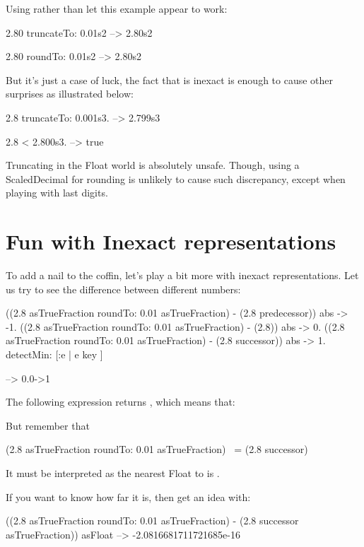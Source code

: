\documentclass[a4paper,10pt,twoside]{book}
\begin{document}
Using  rather than   let this example appear to work:
\begin{code}{}
2.80 truncateTo: 0.01s2
	-->  2.80s2
	
2.80 roundTo: 0.01s2
	-->  2.80s2
\end{code}

But it's just a case of luck, the fact that  is inexact is enough to cause other surprises as illustrated below:
\begin{code}{}
2.8 truncateTo: 0.001s3.
	--> 2.799s3
	
2.8 < 2.800s3.
	--> true
\end{code}

Truncating in the Float world is absolutely unsafe. Though, using a ScaledDecimal for rounding is unlikely to cause such discrepancy, except when playing with last digits.



\section{Fun with Inexact representations}
To add a nail to the coffin, let's play a bit more with inexact representations. Let us try to see the difference between different numbers: 

\begin{code}{}
{
((2.8 asTrueFraction roundTo: 0.01 asTrueFraction) - (2.8 predecessor)) abs -> -1.
((2.8 asTrueFraction roundTo: 0.01 asTrueFraction) - (2.8)) abs -> 0.
((2.8 asTrueFraction roundTo: 0.01 asTrueFraction) - (2.8 successor)) abs -> 1.
} detectMin: [:e | e key ]

--> 0.0->1
\end{code}

The following expression returns , which means that:

But remember that 

\begin{code}{}
(2.8 asTrueFraction roundTo: 0.01 asTrueFraction) ~= (2.8 successor)
\end{code}

It must be interpreted as the nearest Float to  is .

If you want to know how far it is, then get an idea with:

\begin{code}{}
((2.8 asTrueFraction roundTo: 0.01 asTrueFraction) - (2.8 successor asTrueFraction)) asFloat
	--> -2.0816681711721685e-16
\end{code}
\end{document}
